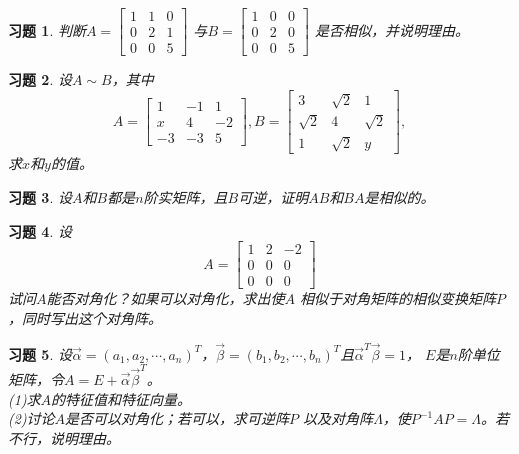 \documentclass[a4paper]{book}
\newtheorem{ex}{习题}[chapter]
\begin{document}
\begin{ex}\label{7.13}
判断$A=\begin{bmatrix}1&1&0\\0&2&1\\0&0&5\end{bmatrix}$
与$B=\begin{bmatrix}1&0&0\\0&2&0\\0&0&5\end{bmatrix}$ 是否相似，并说明理由。
\end{ex}

\begin{ex}\label{7.14}
设$A\sim B$，其中
\begin{equation*}
A=\begin{bmatrix}1&-1&1\\x&4&-2\\-3&-3&5\end{bmatrix},
B=\begin{bmatrix}3&\sqrt{2}&1\\ \sqrt{2}&4&\sqrt{2}\\1&\sqrt{2}&y\end{bmatrix},
\end{equation*}
求$x$和$y$的值。
\end{ex}

\begin{ex}\label{7.15}
设$A$和$B$都是$n$阶实矩阵，且$B$可逆，证明$AB$和$BA$是相似的。
\end{ex}

\begin{ex}\label{7.16}
设
\begin{equation*}
  A=\begin{bmatrix}1&2&-2\\0&0&0\\0&0&0\end{bmatrix}
\end{equation*}
试问$A$能否对角化？如果可以对角化，求出使$A$ 相似于对角矩阵的相似变换矩阵$P$，同时写出这个对角阵。
\end{ex}

\begin{ex}\label{7.17}
设$\vec{\alpha}=(a_1,a_2,\cdots,a_n)^T$，$\vec{\beta}=(b_1,b_2,\cdots,b_n)^T$且$\vec{\alpha}^T\vec{\beta}=1$，
$E$是$n$阶单位矩阵，令$A=E+\vec{\alpha}\vec{\beta}^T$。\\
(1)求$A$的特征值和特征向量。\\
(2)讨论$A$是否可以对角化；若可以，求可逆阵$P$ 以及对角阵$\Lambda$，使$P^{-1}AP=\Lambda$。若不行，说明理由。
\end{ex}
\end{document}
